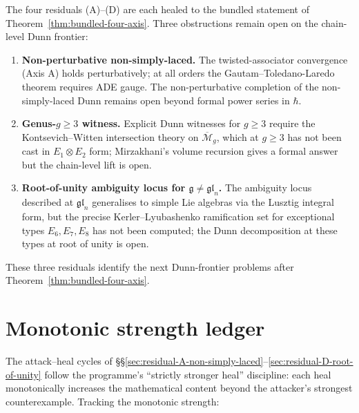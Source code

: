 \documentclass[11pt]{article}
\newcommand{\Eone}{E_{1}}
\newcommand{\Etwo}{E_{2}}
\newcommand{\cM}{\mathcal{M}}
\newcommand{\frakg}{\mathfrak{g}}
\newcommand{\fgl}{\mathfrak{gl}}
\begin{document}
The four residuals (A)--(D) are each healed to the bundled statement of
Theorem~\ref{thm:bundled-four-axis}. Three obstructions remain open on
the chain-level Dunn frontier:
\begin{enumerate}
\item \textbf{Non-perturbative non-simply-laced.} The
  twisted-associator convergence (Axis A) holds perturbatively; at all
  orders the Gautam--Toledano-Laredo theorem requires ADE gauge. The
  non-perturbative completion of the non-simply-laced Dunn remains
  open beyond formal power series in $\hbar$.
\item \textbf{Genus-$g \geq 3$ witness.} Explicit Dunn witnesses for
  $g \geq 3$ require the Kontsevich--Witten intersection theory on
  $\overline{\cM}_g$, which at $g \geq 3$ has not been cast in
  $\Eone \otimes \Etwo$ form; Mirzakhani's volume recursion gives a
  formal answer but the chain-level lift is open.
\item \textbf{Root-of-unity ambiguity locus for $\frakg \neq \fgl_n$.}
  The ambiguity locus described at $\fgl_n$ generalises to simple
  Lie algebras via the Lusztig integral form, but the precise
  Kerler--Lyubashenko ramification set for exceptional types
  $E_6, E_7, E_8$ has not been computed; the Dunn decomposition at
  these types at root of unity is open.
\end{enumerate}
These three residuals identify the next Dunn-frontier problems after
Theorem~\ref{thm:bundled-four-axis}.


\appendix

\section{Monotonic strength ledger}
\label{app:monotonic-strength}

The attack--heal cycles of \S\S\ref{sec:residual-A-non-simply-laced}--\ref{sec:residual-D-root-of-unity}
follow the programme's ``strictly stronger heal'' discipline: each heal
monotonically increases the mathematical content beyond the attacker's
strongest counterexample. Tracking the monotonic strength:
\end{document}
